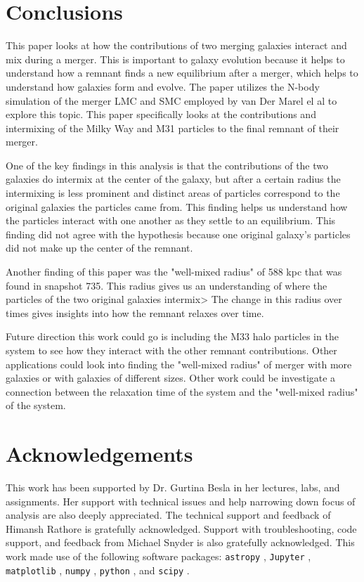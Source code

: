 \documentclass[linenumbers,trackchanges,twocolumn]{aastex7}
\begin{document}
\section{Conclusions} 
This paper looks at how the contributions of two merging galaxies interact and mix during a merger. This is important to galaxy evolution because it helps to understand how a remnant finds a new equilibrium after a merger, which helps to understand how galaxies form and evolve. The paper utilizes the N-body simulation of the merger LMC and SMC employed by van Der Marel el al to explore this topic. This paper specifically looks at the contributions and intermixing of the Milky Way and M31 particles to the final remnant of their merger.

One of the key findings in this analysis is that the contributions of the two galaxies do intermix at the center of the galaxy, but after a certain radius the intermixing is less prominent and distinct areas of particles correspond to the original galaxies the particles came from. This finding helps us understand how the particles interact with one another as they settle to an equilibrium. This finding did not agree with the hypothesis because one original galaxy's particles did not make up the center of the remnant. 

Another finding of this paper was the "well-mixed radius" of 588 kpc that was found in snapshot 735. This radius gives us an understanding of where the particles of the two original galaxies intermix> The change in this radius over times gives insights into how the remnant relaxes over time.

Future direction this work could go is including the M33 halo particles in the system to see how they interact with the other remnant contributions. Other applications could look into finding the "well-mixed radius" of merger with more galaxies or with galaxies of different sizes. Other work could be investigate a connection between the relaxation time of the system and the "well-mixed radius" of the system. 

\section{Acknowledgements} 
This work has been supported by Dr. Gurtina Besla in her lectures, labs, and assignments. Her support with technical issues and help narrowing down focus of analysis are also deeply appreciated. The technical support and feedback of Himansh Rathore is gratefully acknowledged. Support with troubleshooting, code support, and feedback from Michael Snyder is also gratefully acknowledged. This work made use of the following software packages: \texttt{astropy} \citep{astropy:2013, astropy:2018, astropy:2022}, \texttt{Jupyter} \citep{2007CSE.....9c..21P, kluyver2016jupyter}, \texttt{matplotlib} \citep{Hunter:2007}, \texttt{numpy} \citep{numpy}, \texttt{python} \citep{python}, and \texttt{scipy} \citep{2020SciPy-NMeth, scipy_15366870}.
\end{document}
